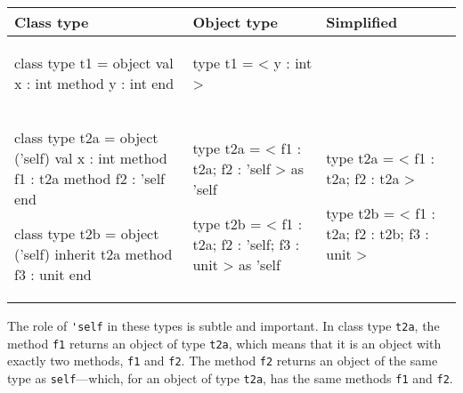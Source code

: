 \begin{center}
\begin{tabular}{lll}
Class type & Object type & Simplified\\
\hline
\begin{minipage}[t]{1.5in}
\begin{ocamllisting}
class type t1 =
object
   val x : int
   method y : int
end
\end{ocamllisting}
\end{minipage}
&
\begin{minipage}[t]{1.5in}
\begin{ocamllisting}
type t1 = < y : int >
\end{ocamllisting}
\end{minipage}
\\
\begin{minipage}[t]{1.5in}
\begin{ocamllisting}
class type t2a =
object ('self)
   val x : int
   method f1 : t2a
   method f2 : 'self  
end

class type t2b =
object ('self)
   inherit t2a
   method f3 : unit
end
\end{ocamllisting}
\end{minipage}
&
\begin{minipage}[t]{1.5in}
\begin{ocamllisting}
type t2a =
   < f1 : t2a;
     f2 : 'self
    > as 'self



type t2b =
   < f1 : t2a;
     f2 : 'self;
     f3 : unit
   > as 'self
\end{ocamllisting}
\end{minipage}
&
\begin{minipage}[t]{1in}
\begin{ocamllisting}
type t2a =
   < f1 : t2a;
     f2 : t2a
    >



type t2b =
   < f1 : t2a;
     f2 : t2b;
     f3 : unit
   >
\end{ocamllisting}
\end{minipage}
\end{tabular}
\end{center}
%
The role of \hbox{\lstinline/'self/} in these types is subtle and important.  In class
type \hbox{\lstinline/t2a/}, the method \hbox{\lstinline/f1/} returns an object of type \hbox{\lstinline/t2a/}, which
means that it is an object with exactly two methods, \hbox{\lstinline/f1/} and \hbox{\lstinline/f2/}.  The
method \hbox{\lstinline/f2/} returns an object of the same type as \hbox{\lstinline/self/}---which,
for an object of type \hbox{\lstinline/t2a/}, has the same methods \hbox{\lstinline/f1/} and \hbox{\lstinline/f2/}.

